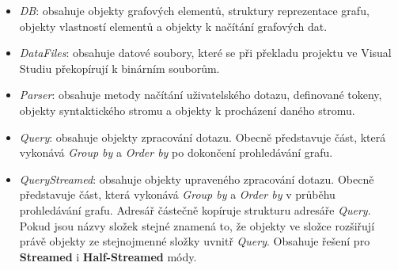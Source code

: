 \begin{itemize}

\item \textit{DB}: obsahuje objekty grafových elementů, struktury reprezentace grafu, objekty vlastností elementů a objekty k načítání grafových dat. 

\item \textit{DataFiles}: obsahuje datové soubory, které se při překladu projektu ve Visual Studiu překopírují k binárním souborům.

\item \textit{Parser}: obsahuje metody načítání uživatelského dotazu, definované tokeny, objekty syntaktického stromu a objekty k procházení daného stromu.

\item \textit{Query}: obsahuje objekty zpracování dotazu. 
Obecně představuje část, která vykonává \textit{Group by} a \textit{Order by} po dokončení prohledávání grafu. 

\item \textit{QueryStreamed}: obsahuje objekty upraveného zpracování dotazu. 
Obecně představuje část, která vykonává \textit{Group by} a \textit{Order by} v průběhu prohledávání grafu.
Adresář částečně kopíruje strukturu adresáře \textit{Query}.
Pokud jsou názvy složek stejné znamená to, že objekty ve složce rozšiřují právě objekty ze stejnojmenné složky uvnitř \textit{Query}. 
Obsahuje řešení pro \textbf{Streamed} i \textbf{Half-Streamed} módy.

\end{itemize}

